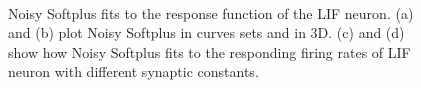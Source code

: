 \documentclass[runningheads,a4paper]{llncs}
\begin{document}
\begin{figure}[bt!]
	\centering
	\\
	\caption{
	Noisy Softplus fits to the response function of the LIF neuron.
	(a) and (b) plot Noisy Softplus in curves sets and in 3D.
	(c) and (d) show how Noisy Softplus fits to the responding firing rates of LIF neuron with different synaptic constants.}
	\label{fig:nsp}
\end{figure}
\end{document}
